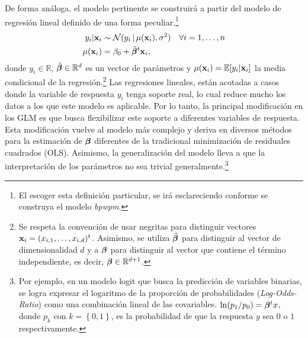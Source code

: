 \documentclass[../Main/Main.tex]{subfiles}
\begin{document}
De forma análoga, el modelo pertinente se construirá a partir del modelo de regresión lineal definido de una forma peculiar.\footnote{El escoger esta definición particular, se irá esclareciendo conforme se construya el modelo \textit{bpwpm}.}
\begin{align*}
	y_i|\mathbf{x}_i &\sim \mathcal{N}(y_i \,|\,\mu(\mathbf{x}_i), \sigma^2)  \quad \forall i = 1,\ldots,n\\
	\mu(\mathbf{x}_i) &= \beta_0 + \tilde{\bm{\beta}}^t\mathbf{x}_i,
\end{align*}
donde $y_i \in\mathbb{R}$, $\tilde{\bm{\beta}} \in \mathbb{R}^{d}$ es un vector de parámetros y $\mu(\mathbf{x}_i) = \mathbb{E}[y_i|\mathbf{x}_i]$ la media condicional de la regresión.\footnote{Se respeta la convención de usar negritas para distinguir vectores $\mathbf{x}_i = (x_{i,1},\ldots,x_{i,d})^t$. Asimismo, se utiliza $\tilde{\bm{\beta}}$ para distinguir al vector de dimensionalidad $d$ y a $\bm{\beta}$ para distinguir al vector que contiene el término independiente, es decir, $\bm{\beta}\in \mathbb{R}^{d+1}$.} Las regresiones lineales, están acotadas a casos donde la variable de respuesta $y_i$ tenga soporte real, lo cual reduce mucho los datos a los que este modelo es aplicable. Por lo tanto, la principal modificación en los GLM es que busca flexibilizar este soporte a diferentes variables de respuesta. Esta modificación vuelve al modelo más complejo y deriva en diversos métodos para la estimación de $\bm{\beta}$ diferentes de la tradicional minimización de residuales cuadrados (OLS).  Asimismo, la generalización del modelo lleva a que la interpretación de los parámetros no sea trivial generalmente.\footnote{Por ejemplo, en un modelo logit que busca la predicción de variables binarias, se logra expresar el logaritmo de la proporción de probabilidades (\textit{Log-Odds-Ratio}) como una combinación lineal de las covariables. $\ln(p_1 / p_0) = \bm{\beta}^t x$, donde $p_k$ con  $k = \left\{0,1\right\}$, es la probabilidad de que la respuesta $y$ sea $0$ o $1$ respectivamente.}
\end{document}
